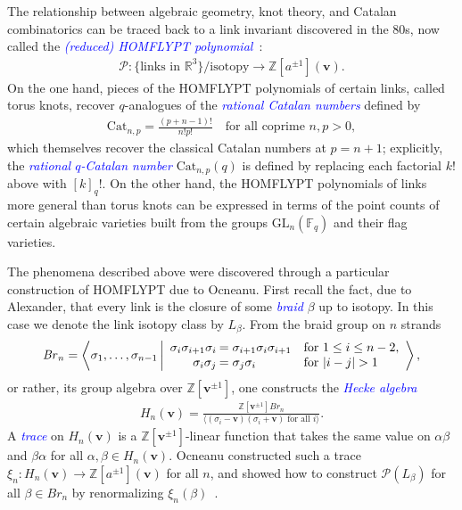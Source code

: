 \documentclass[submission]{FPSAC2025}
\newcommand{\dfemph}[1]{\textcolor{blue}{\emph{#1}}}
\newcommand{\m}{p}
\newcommand{\x}{\mathbf{v}}
\newcommand{\Br}{\mathit{Br}}
\newcommand{\HOMFLYPT}{\mathcal{P}}
\newcommand{\Cat}{\mathrm{Cat}}
\begin{document}
The relationship between algebraic geometry, knot theory, and Catalan combinatorics can be traced back to a link invariant discovered in the 80s, now called the \dfemph{(reduced) HOMFLYPT polynomial}~\cite{homfly}:
\begin{align}
\HOMFLYPT : \{\text{links in $\mathbb{R}^3$}\}/\text{isotopy} \to \mathbb{Z}[a^{\pm 1}](\x).
\end{align}
On the one hand, pieces of the HOMFLYPT polynomials of certain links, called torus knots, recover $q$-analogues of the \dfemph{rational Catalan numbers} defined by
\begin{align}
\Cat_{n, \m} = \frac{(\m + n - 1)!}{n!\m!}
	\quad\text{for all coprime $n, \m > 0$},
\end{align}
which themselves recover the classical Catalan numbers at $\m = n + 1$; explicitly, the \dfemph{rational $q$-Catalan number} $\Cat_{n, \m}(q)$ is defined by replacing each factorial $k!$ above with $[k]_q!$.
On the other hand, the HOMFLYPT polynomials of links more general than torus knots can be expressed in terms of the point counts of certain algebraic varieties built from the groups $\mathrm{GL}_n(\mathbb{F}_q)$ and their flag varieties.

The phenomena described above were discovered through a particular construction of HOMFLYPT due to Ocneanu. 
First recall the fact, due to Alexander, that every link is the closure of some \dfemph{braid} $\beta$ up to isotopy.
In this case we denote the link isotopy class by $L_\beta$.
From the braid group on $n$ strands 
\begin{align}
\Br_n = \left\langle \sigma_1, \ldots, \sigma_{n - 1}\, \middle|
	\begin{array}{r@{\:}ll}
	\sigma_i \sigma_{i + 1} \sigma_i
		&= \sigma_{i + 1} \sigma_i \sigma_{i + 1}
		&\text{for $1 \leq i \leq n - 2$},\\
	\sigma_i \sigma_j
		&= \sigma_j \sigma_i
		&\text{for $|i - j| > 1$}
	\end{array}
	\right\rangle,
\end{align}
or rather, its group algebra over $\mathbb{Z}[\x^{\pm 1}]$, one constructs the \dfemph{Hecke algebra} 
\begin{align}
H_n(\x) = \frac{\mathbb{Z}[\x^{\pm 1}]\Br_n}{\langle \text{$(\sigma_i - \x)(\sigma_i + \x)$ for all $i$}\rangle}.
\end{align}
A \dfemph{trace} on $H_n(\x)$ is a $\mathbb{Z}[\x^{\pm 1}]$-linear function that takes the same value on $\alpha\beta$ and $\beta\alpha$ for all $\alpha, \beta \in H_n(\x)$.
Ocneanu constructed such a trace $\xi_n : H_n(\x) \to \mathbb{Z}[a^{\pm 1}](\x)$ for all $n$, and showed how to construct $\HOMFLYPT(L_\beta)$ for all $\beta \in \Br_n$ by renormalizing $\xi_n(\beta)$~\cite{jones-v}.
\end{document}
